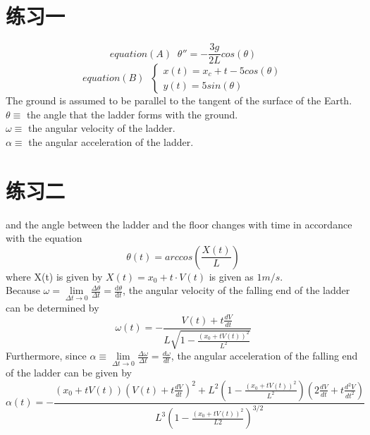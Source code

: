 \documentclass[fleqn]{article}
\begin{document}
\section*{练习一}
\begin{equation}
    equation(A) \;\; \theta'' = -\frac{3g}{2L}cos(\theta) 
\end{equation}
\begin{equation}
    equation(B) \;\;
        \begin{cases}
          x(t)=x_c+t-5cos(\theta) \\
          y(t)=5sin(\theta)
        \end{cases}
\end{equation}
The ground is assumed to be parallel to the tangent of the surface of the Earth.\\
$\theta \equiv$ the angle that the ladder forms with the ground. \\
$\omega \equiv$ the angular velocity of the ladder. \\
$\alpha \equiv$ the angular acceleration of the ladder.

\pagebreak
{}
\section*{练习二}
\setcounter{section}{1}
and the angle between the ladder and the floor changes with time in accordance with the equation\\
\begin{equation}
    \theta(t) = arccos (\frac{X(t)}{L})
\end{equation}
where X(t) is given by $X(t) = x_0 + t \cdot V(t)$ is given as $ 1 m/s$. \\
Because $\omega = \lim\limits_{\Delta t \to 0} \frac{\Delta \theta}{\Delta t} = \frac{\mathrm{d}\theta}{\mathrm{d}t}$, the angular velocity of the falling end of the ladder can be determined by \\
\begin{equation}
    \omega(t) = - \frac{V(t)+t\frac{dV}{dt}}{L\sqrt{1-\frac{(x_0+tV(t))^2}{L^2}}}
\end{equation}
Furthermore, since $\alpha \equiv \lim\limits_{\Delta t \to 0} \frac{\Delta \omega}{\Delta t} = \frac{d \omega}{dt}$, the angular acceleration of the falling end of the ladder can be given by \\
\begin{equation}
    \alpha(t) = - \frac{(x_0+tV(t))\left(V(t)+t\frac{dV}{dt}\right)^2 + L^2\left(1-\frac{(x_0+tV(t))^2}{L^2}\right) \left(2\frac{dV}{dt}+t\frac{d^2V}{dt^2}\right)}{L^3\left(1-\frac{\left(x_0+tV(t)\right)^2}{L2}\right)^{3/2}}
\end{equation}
\pagebreak
\end{document}
